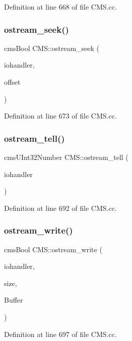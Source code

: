 Definition at line 668 of file C\+M\+S.\+cc.

\mbox{\label{namespace_c_m_s_a42537c0a11f8f118b0380d202ff24430}} 
\subsubsection{\texorpdfstring{ostream\+\_\+seek()}{ostream\_seek()}}
{\footnotesize\ttfamily cms\+Bool C\+M\+S\+::ostream\+\_\+seek (\begin{DoxyParamCaption}\item[{cms\+I\+O\+H\+A\+N\+D\+L\+ER $\ast$}]{iohandler,  }\item[{cms\+U\+Int32\+Number}]{offset }\end{DoxyParamCaption})}



Definition at line 673 of file C\+M\+S.\+cc.

\mbox{\label{namespace_c_m_s_a4420e9cff988db0418ae3a9c76ec5f9e}} 
\subsubsection{\texorpdfstring{ostream\+\_\+tell()}{ostream\_tell()}}
{\footnotesize\ttfamily cms\+U\+Int32\+Number C\+M\+S\+::ostream\+\_\+tell (\begin{DoxyParamCaption}\item[{cms\+I\+O\+H\+A\+N\+D\+L\+ER $\ast$}]{iohandler }\end{DoxyParamCaption})}



Definition at line 692 of file C\+M\+S.\+cc.

\mbox{\label{namespace_c_m_s_ac6a6e80213301c0cbce0fcd8a98e6108}} 
\subsubsection{\texorpdfstring{ostream\+\_\+write()}{ostream\_write()}}
{\footnotesize\ttfamily cms\+Bool C\+M\+S\+::ostream\+\_\+write (\begin{DoxyParamCaption}\item[{cms\+I\+O\+H\+A\+N\+D\+L\+ER $\ast$}]{iohandler,  }\item[{cms\+U\+Int32\+Number}]{size,  }\item[{const void $\ast$}]{Buffer }\end{DoxyParamCaption})}



Definition at line 697 of file C\+M\+S.\+cc.

